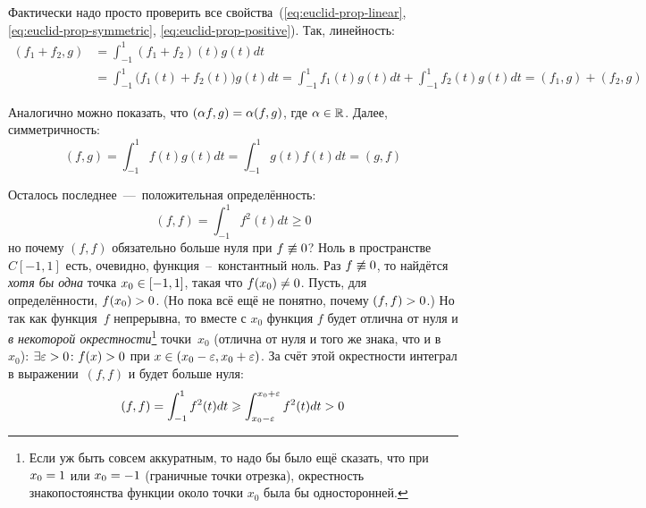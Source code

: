 \documentclass[a4paper,12pt]{article}
\begin{document}
  \begin{solution}
    Фактически надо просто проверить все свойства~(\ref{eq:euclid-prop-linear}, \ref{eq:euclid-prop-symmetric}, \ref{eq:euclid-prop-positive}).
    Так, линейность:
    \begin{equation}
    \begin{split}
      (f_1 + f_2, g) &= \int_{-1}^{1} (f_1 + f_2)(t) g(t) dt\\
      &= \int_{-1}^{1} \bigl(f_1(t) + f_2(t)\bigr) g(t) dt
      = \int_{-1}^{1} f_1(t) g(t) dt + \int_{-1}^{1} f_2(t) g(t) dt
      = (f_1, g) + (f_2, g)
    \end{split}
    \end{equation}
    
    Аналогично можно показать, что $(\alpha f, g) \hm= \alpha (f, g)$, где $\alpha \hm\in \RR$.
    Далее, симметричность:
    \[
      (f, g) = \int_{-1}^{1} f(t) g(t) dt
      = \int_{-1}^{1} g(t) f(t) dt
      = (g, f)
    \]
    
    Осталось последнее~---~положительная определённость:
    \[
      (f, f) = \int_{-1}^{1} f^2(t) dt \geq 0
    \]
    но почему $(f, f)$ обязательно больше нуля при $f \hm{\not\equiv} 0$?
    Ноль в пространстве $C[-1, 1]$ есть, очевидно, функция~--~константный ноль.
    Раз $f \hm{\not\equiv} 0$, то найдётся \emph{хотя бы одна} точка $x_0 \hm\in [-1, 1]$, такая что $f(x_0) \hm{\not=} 0$.
    Пусть, для определённости, $f(x_0) \hm> 0$.
    (Но пока всё ещё не понятно, почему $(f, f) \hm> 0$.)
    Но так как функция~$f$ непрерывна, то вместе с $x_0$ функция $f$ будет отлична от нуля и \emph{в некоторой окрестности}\footnote{Если уж быть совсем аккуратным, то надо бы было ещё сказать, что при $x_0 \hm= 1$ или $x_0 \hm= -1$ (граничные точки отрезка), окрестность знакопостоянства функции около точки $x_0$ была бы односторонней.} точки~$x_0$ (отлична от нуля и того же знака, что и в~$x_0$): $\exists \eps \hm> 0 \colon f(x) \hm> 0$ при $x \hm\in (x_0 \hm- \eps, x_0 \hm+ \eps)$.
    За счёт этой окрестности интеграл в выражении~$(f, f)$ и будет больше нуля:
    \[
      (f, f) = \int_{-1}^{1} f^2(t) dt \geqslant \int_{x_0 - \varepsilon}^{x_0 + \varepsilon} f^2(t) dt > 0
    \]
  \end{solution}
\end{document}
